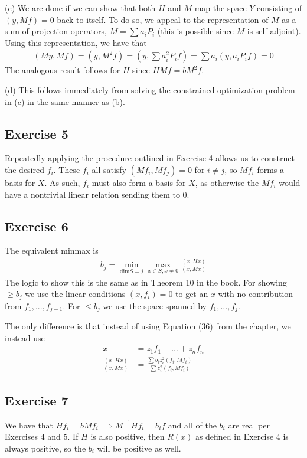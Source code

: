 (c) We are done if we can show that both $H$ and $M$ map the space $Y$ consisting of
$(y, Mf) = 0$ back to itself. To do so, we appeal to the representation of $M$ as a sum of projection
operators, $M = \sum a_i P_i$ (this is possible since $M$ is self-adjoint). Using this representation,
we have that
\begin{align*}
        (My, Mf) = (y, M^2 f) = (y, \sum a_i^2 P_i f) = \sum a_i (y, a_i P_i f) = 0
\end{align*}
The analogous result follows for $H$ since $HM f = b M^2 f$.

(d) This follows immediately from solving the constrained optimization problem in (c) in the same manner
as (b).

\subsection{Exercise 5}
Repeatedly applying the procedure outlined in Exercise 4 allows us to construct the desired $f_i$. These
$f_i$ all satisfy $(Mf_i, Mf_j) = 0$ for $i \neq j$, so $Mf_i$ forms a basis for $X$. 
As such, $f_i$ must also form a 
basis for $X$, as otherwise the $Mf_i$ would have a nontrivial linear relation sending them to 0.

\subsection{Exercise 6}
The equivalent minmax is
\begin{align*}
        b_j = \min_{\text{dim} S = j} \max_{x \in S, x \neq 0} \frac{(x, Hx)}{(x, Mx)}
\end{align*}
The logic to show this is the same as in Theorem 10 in the book. For showing $\geq b_j$ we use the linear
conditions $(x, f_i) = 0$ to get an $x$ with no contribution from $f_1, ..., f_{j-1}$. For $\leq b_j$ 
we use the space spanned by $f_1, ..., f_j$.

The only difference is that instead of using Equation (36) from the chapter, we instead use
\begin{align*}
        x &= z_1 f_1 + ... + z_n f_n \\
        \frac{(x, Hx)}{(x, Mx)} &= \frac{\sum b_i z_i^2 (f_i, Mf_i)}{\sum z_i^2 (f_i, Mf_i)}
\end{align*}

\subsection{Exercise 7}
We have that $Hf_i = bMf_i \implies M^{-1} H f_i = b_i f$ and all of the $b_i$ are real per Exercises 4 and 5.
If $H$ is also positive, then $R(x)$ as defined in Exercise 4 is always positive, so the $b_i$ will be
positive as well.

